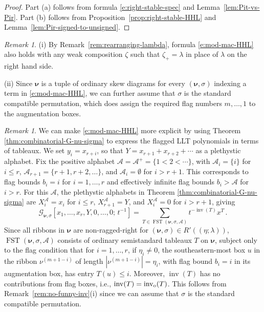 \documentclass[12pt]{amsart}
\theoremstyle{definition}
\theoremstyle{remark}
\newtheorem{remark}[thm]{Remark}
\newcommand{\nubold}{{\boldsymbol \nu }}
\newcommand{\Acal}{{\mathcal A}}
\newcommand{\Gcal}{{\mathcal G}}
\DeclareMathOperator{\inv}{inv}
\newcommand{\oinv}{\inv _{{\rm o}}}
\DeclareMathOperator{\FSST}{FST}
\begin{document}
\begin{proof}
Part (a) follows from formula \eqref{e:right-stable-spec} and
Lemma~\ref{lem:Pit-vs-Pir}.  Part (b) follows from
Proposition~\ref{prop:right-stable-HHL} and
Lemma~\ref{lem:Pir-signed-to-unsigned}.
\end{proof}

\begin{remark}\label{rem:rearranging-lambda-2}
(i) By Remark~\ref{rem:rearranging-lambda}, formula \eqref{e:mod-mac-HHL}
also holds with any weak composition $\zeta $ such that $\zeta _{+} =
\lambda $ in place of $\lambda $ on the right hand side.

(ii) Since $\nubold $ is a tuple of ordinary skew diagrams for every
$(\nubold ,\sigma )$ indexing a term in \eqref{e:mod-mac-HHL}, we can
further assume that $\sigma $ is the standard compatible permutation,
which does assign the required flag numbers $m,\ldots,1$ to the
augmentation boxes.
\end{remark}

\begin{remark}\label{rem:mod-mac-HHL explicit}
We can make \eqref{e:mod-mac-HHL} more explicit by using Theorem
\ref{thm:combinatorial-G-nu-sigma} to express the flagged LLT
polynomials in terms of tableaux.  We set $y_{i}=x_{r+i}$, so that $Y
= x_{r+1}+x_{r+2}+\cdots $ as a plethystic alphabet.  Fix the positive
alphabet $\Acal = \Acal^+ = \{1 < 2 < \cdots \}$, with $\Acal_i =
\{i\}$ for $i \le r$, $\Acal_{r+1} = \{r+1, r+2, \dots\}$, and
$\Acal_i=\emptyset$ for $i > r+1$.  This corresponds to flag bounds
$b_{i}=i$ for $i=1,\ldots,r$ and effectively infinite flag bounds
$b_{i}>\Acal $ for $i>r$.  For this $\Acal $, the plethystic alphabets
in Theorem \ref{thm:combinatorial-G-nu-sigma} are $X_{i}^{\Acal } =
x_{i}$ for $i\leq r$, $X_{r+1}^{\Acal } = Y$, and $X_{i}^{\Acal } = 0$
for $i>r+1$, giving
\begin{equation}\label{e:}
\Gcal_{\nubold ,\sigma }[x_{1}, \ldots, x_{r}, Y, 0,\ldots,0;\,
t^{-1}] =  \sum _{T\in \FSST (\nubold , \sigma , \Acal
)} t^{-\inv (T)} x^{T}\, .
\end{equation}
Since all ribbons in $\nubold$ are non-ragged-right for $(\nubold,
\sigma) \in R'((\eta ;\lambda ))$, $\FSST(\nubold , \sigma , \Acal )$
consists of ordinary semistandard tableaux $T$ on $\nubold$, subject
only to the flag condition that for $i = 1,\dots, r$, if $\eta
_{i}\not =0$, the southeastern-most box $u$ in the ribbon
$\nu^{(m+1-i)}$ of length $|\nu^{(m+1-i)}| = \eta_i$, with flag bound
$b_{i} = i$ in its augmentation box, has entry $T(u)\leq i$.
Moreover, $\inv (T)$ has no contributions from flag boxes, i.e.,
$\inv(T)= \oinv (T)$.  This follows from
Remark~\ref{rem:no-funny-inv}(i) since we can assume that $\sigma$ is
the standard compatible permutation.
\end{remark}
\end{document}
